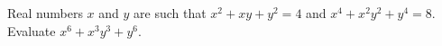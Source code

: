 \problem
Real numbers $x$ and $y$ are such that
$x^2 + x y + y^2 = 4$ and $x^4 + x^2 y^2 + y^4 = 8$.
Evaluate $x^6 + x^3 y^3 + y^6$.
\solution
\endproblem
